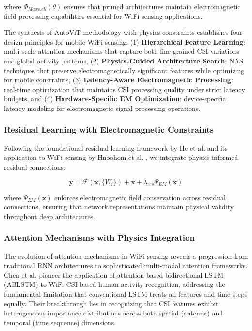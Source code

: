 \documentclass[journal]{IEEEtran}
\begin{document}
where $\Phi_{Maxwell}(\theta)$ ensures that pruned architectures maintain electromagnetic field processing capabilities essential for WiFi sensing applications.

The synthesis of AutoViT methodology with physics constraints establishes four design principles for mobile WiFi sensing: (1) \textbf{Hierarchical Feature Learning}: multi-scale attention mechanisms that capture both fine-grained CSI variations and global activity patterns, (2) \textbf{Physics-Guided Architecture Search}: NAS techniques that preserve electromagnetically significant features while optimizing for mobile constraints, (3) \textbf{Latency-Aware Electromagnetic Processing}: real-time optimization that maintains CSI processing quality under strict latency budgets, and (4) \textbf{Hardware-Specific EM Optimization}: device-specific latency modeling for electromagnetic signal processing operations.

\subsubsection{Residual Learning with Electromagnetic Constraints}

Following the foundational residual learning framework by He et al. \cite{he2016deep} and its application to WiFi sensing by Hnoohom et al. \cite{hnoohom2024efficient}, we integrate physics-informed residual connections:

\begin{equation}
\mathbf{y} = \mathcal{F}(\mathbf{x}, \{W_i\}) + \mathbf{x} + \lambda_{res} \Psi_{EM}(\mathbf{x})
\label{eq:resnet_physics}
\end{equation}

where $\Psi_{EM}(\mathbf{x})$ enforces electromagnetic field conservation across residual connections, ensuring that network representations maintain physical validity throughout deep architectures.

\subsubsection{Attention Mechanisms with Physics Integration}

The evolution of attention mechanisms in WiFi sensing reveals a progression from traditional RNN architectures to sophisticated multi-modal attention frameworks. Chen et al. \cite{chen2018wifi} pioneer the application of attention-based bidirectional LSTM (ABLSTM) to WiFi CSI-based human activity recognition, addressing the fundamental limitation that conventional LSTM treats all features and time steps equally. Their breakthrough lies in recognizing that CSI features exhibit heterogeneous importance distributions across both spatial (antenna) and temporal (time sequence) dimensions.
\end{document}
